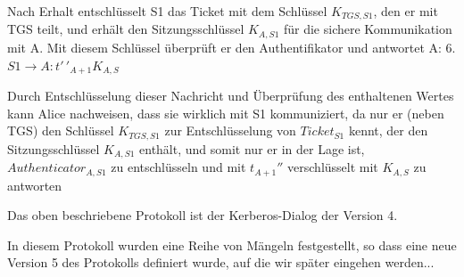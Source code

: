 \documentclass[a4paper]{article}
\begin{document}
\begin{multicols}{3}
\begin{itemize*}
            \item Nach Erhalt entschlüsselt S1 das Ticket mit dem Schlüssel $K_{TGS,S1}$, den er mit TGS teilt, und erhält den Sitzungsschlüssel $K_{A,S1}$ für die sichere Kommunikation mit A. Mit diesem Schlüssel überprüft er den Authentifikator und antwortet A: 6. $S1\rightarrow A:{t'\,'_{A+1}}{K_{A,S}}$
            \item Durch Entschlüsselung dieser Nachricht und Überprüfung des enthaltenen Wertes kann Alice nachweisen, dass sie wirklich mit S1 kommuniziert, da nur er (neben TGS) den Schlüssel $K_{TGS,S1}$ zur Entschlüsselung von $Ticket_{S1}$ kennt, der den Sitzungsschlüssel $K_{A,S1}$ enthält, und somit nur er in der Lage ist, $Authenticator_{A,S1}$ zu entschlüsseln und mit $t_{A+1}''$ verschlüsselt mit $K_{A,S}$ zu antworten
            \item Das oben beschriebene Protokoll ist der Kerberos-Dialog der Version 4.
            \begin{itemize*}
                  \item In diesem Protokoll wurden eine Reihe von Mängeln festgestellt, so dass eine neue Version 5 des Protokolls definiert wurde, auf die wir später eingehen werden...
            \end{itemize*}
      \end{itemize*}


\end{multicols}
\end{document}
